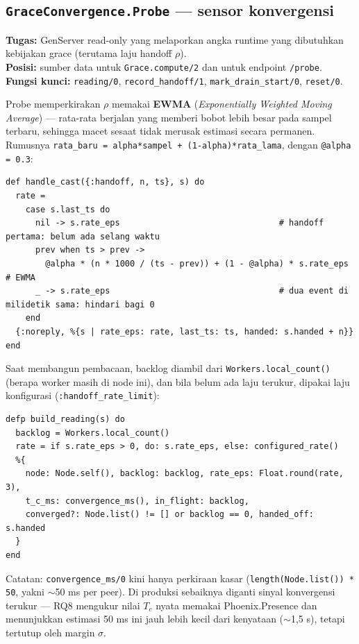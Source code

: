 \documentclass[11pt]{article}
\newcommand{\code}[1]{\texttt{\small #1}}
\newcommand{\istilah}[1]{\textbf{#1}}
\begin{document}
\subsection{\texttt{GraceConvergence.Probe} --- sensor konvergensi}
\textbf{Tugas:} GenServer read-only yang melaporkan angka runtime yang dibutuhkan kebijakan grace
(terutama laju handoff $\rho$). \\
\textbf{Posisi:} sumber data untuk \code{Grace.compute/2} dan untuk endpoint \code{/probe}. \\
\textbf{Fungsi kunci:} \code{reading/0}, \code{record\_handoff/1}, \code{mark\_drain\_start/0},
\code{reset/0}.

Probe memperkirakan $\rho$ memakai \istilah{EWMA} (\emph{Exponentially Weighted Moving Average}) ---
rata-rata berjalan yang memberi bobot lebih besar pada sampel terbaru, sehingga macet sesaat tidak
merusak estimasi secara permanen. Rumusnya \code{rata\_baru = alpha*sampel + (1-alpha)*rata\_lama},
dengan \code{@alpha = 0.3}:
\begin{lstlisting}[style=ex]
def handle_cast({:handoff, n, ts}, s) do
  rate =
    case s.last_ts do
      nil -> s.rate_eps                                # handoff pertama: belum ada selang waktu
      prev when ts > prev ->
        @alpha * (n * 1000 / (ts - prev)) + (1 - @alpha) * s.rate_eps  # EWMA
      _ -> s.rate_eps                                  # dua event di milidetik sama: hindari bagi 0
    end
  {:noreply, %{s | rate_eps: rate, last_ts: ts, handed: s.handed + n}}
end
\end{lstlisting}
Saat membangun pembacaan, backlog diambil dari \code{Workers.local\_count()} (berapa worker masih di
node ini), dan bila belum ada laju terukur, dipakai laju konfigurasi (\code{:handoff\_rate\_limit}):
\begin{lstlisting}[style=ex]
defp build_reading(s) do
  backlog = Workers.local_count()
  rate = if s.rate_eps > 0, do: s.rate_eps, else: configured_rate()
  %{
    node: Node.self(), backlog: backlog, rate_eps: Float.round(rate, 3),
    t_c_ms: convergence_ms(), in_flight: backlog,
    converged?: Node.list() != [] or backlog == 0, handed_off: s.handed
  }
end
\end{lstlisting}
Catatan: \code{convergence\_ms/0} kini hanya perkiraan kasar (\code{length(Node.list()) * 50}, yakni
$\sim$50 ms per peer). Di produksi sebaiknya diganti sinyal konvergensi terukur --- RQ8 mengukur nilai
$T_c$ nyata memakai Phoenix.Presence dan menunjukkan estimasi 50 ms ini jauh lebih kecil dari kenyataan
($\sim$1{,}5 s), tetapi tertutup oleh margin $\sigma$.
\end{document}
